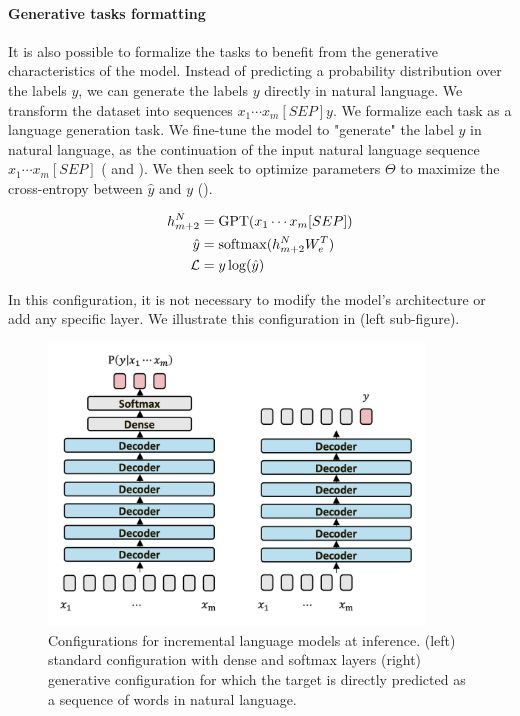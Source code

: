 \paragraph{Generative tasks formatting} It is also possible to formalize the tasks to benefit from the generative characteristics of the model. Instead of predicting a probability distribution over the labels $y$, we can generate the labels $y$ directly in natural language. We transform the dataset into sequences $x_1 \cdots x_m [SEP] y$. We formalize each task as a language generation task. We fine-tune the model to "generate" the label $y$ in natural language, as the continuation of the input natural language sequence $x_1 \cdots x_m [SEP]$ ( and ). We then seek to optimize \gpt parameters $\Theta$ to maximize the cross-entropy between $\hat{y}$ and $y$ ().

\begin{align}
    h_{m+2}^N &= \textrm{GPT}(x_1 \cdots x_m [SEP]) \labeq{generative:gpt-lm} \\
    \hat{y} &= \softmax(h_{m+2}^N W_e^T) \labeq{generative:token-proba-m+1} \\
    \mathcal{L} &= y \log(\hat{y}) \labeq{generative:cross-entropy}
\end{align}

In this configuration, it is not necessary to modify the model's architecture or add any specific layer. We illustrate this configuration in  (left sub-figure).

\begin{figure}[!htb]
\begin{center}
\includegraphics[width=10cm]{images/generative-2.png}
\end{center}
\caption{Configurations for incremental language models at inference. (left) standard configuration with dense and softmax layers (right) generative configuration for which the target is directly predicted as a sequence of words in natural language.}
\end{figure}

